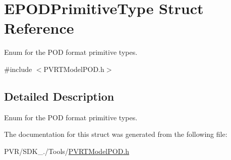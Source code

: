 \hypertarget{struct_e_p_o_d_primitive_type}{\section{E\+P\+O\+D\+Primitive\+Type Struct Reference}
\label{struct_e_p_o_d_primitive_type}
}


Enum for the P\+O\+D format primitive types.  




{\ttfamily \#include $<$P\+V\+R\+T\+Model\+P\+O\+D.\+h$>$}



\subsection{Detailed Description}
Enum for the P\+O\+D format primitive types. 



 

The documentation for this struct was generated from the following file\+:\begin{DoxyCompactItemize}
\item 
P\+V\+R/\+S\+D\+K\+\_./\+Tools/\hyperlink{_p_v_r_t_model_p_o_d_8h}{P\+V\+R\+T\+Model\+P\+O\+D.\+h}\end{DoxyCompactItemize}
